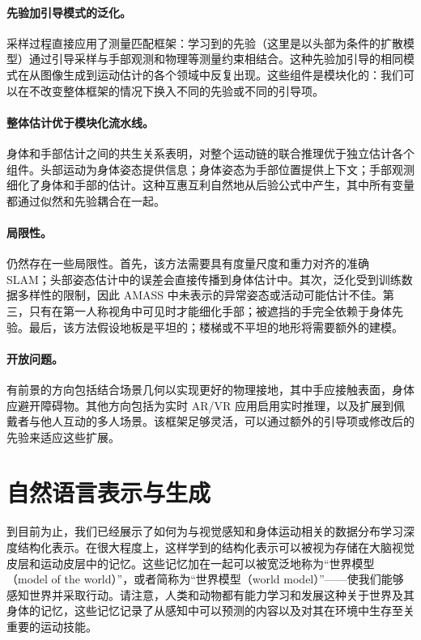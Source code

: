 \documentclass[../../book-main_zh.tex]{subfiles}
\begin{document}
\paragraph{先验加引导模式的泛化。}
采样过程直接应用了测量匹配框架：学习到的先验（这里是以头部为条件的扩散模型）通过引导采样与手部观测和物理等测量约束相结合。这种先验加引导的相同模式在从图像生成到运动估计的各个领域中反复出现。这些组件是模块化的：我们可以在不改变整体框架的情况下换入不同的先验或不同的引导项。

\paragraph{整体估计优于模块化流水线。}
身体和手部估计之间的共生关系表明，对整个运动链的联合推理优于独立估计各个组件。头部运动为身体姿态提供信息；身体姿态为手部位置提供上下文；手部观测细化了身体和手部的估计。这种互惠互利自然地从后验公式中产生，其中所有变量都通过似然和先验耦合在一起。

\paragraph{局限性。}
仍然存在一些局限性。首先，该方法需要具有度量尺度和重力对齐的准确 SLAM；头部姿态估计中的误差会直接传播到身体估计中。其次，泛化受到训练数据多样性的限制，因此 AMASS 中未表示的异常姿态或活动可能估计不佳。第三，只有在第一人称视角中可见时才能细化手部；被遮挡的手完全依赖于身体先验。最后，该方法假设地板是平坦的；楼梯或不平坦的地形将需要额外的建模。

\paragraph{开放问题。}
有前景的方向包括结合场景几何以实现更好的物理接地，其中手应接触表面，身体应避开障碍物。其他方向包括为实时 AR/VR 应用启用实时推理，以及扩展到佩戴者与他人互动的多人场景。该框架足够灵活，可以通过额外的引导项或修改后的先验来适应这些扩展。




\section{自然语言表示与生成}\label{sec:clm_text}
到目前为止，我们已经展示了如何为与视觉感知和身体运动相关的数据分布学习深度结构化表示。在很大程度上，这样学到的结构化表示可以被视为存储在大脑视觉皮层和运动皮层中的记忆。这些记忆加在一起可以被宽泛地称为“世界模型（model of the world）”，或者简称为“世界模型（world model）”——使我们能够感知世界并采取行动。请注意，人类和动物都有能力学习和发展这种关于世界及其身体的记忆，这些记忆记录了从感知中可以预测的内容以及对其在环境中生存至关重要的运动技能。
\end{document}
